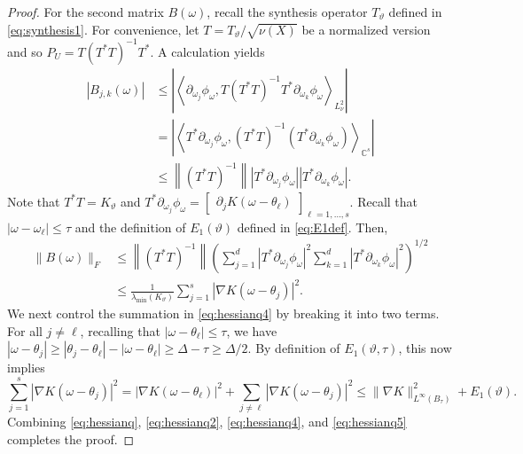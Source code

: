 \documentclass[10pt,a4paper]{amsart}
\def\C{\mathbb{C}}
\newcommand{\inner}[1]{{\left\langle#1\right\rangle}}
\newcommand{\norm}[1]{{\left\|#1\right\|}}
\newcommand{\sampset}{X}
\begin{document}
\begin{proof}
	For the second matrix $B(\omega)$, recall the synthesis operator $T_\vartheta$ defined in \eqref{eq:synthesis1}. For convenience, let $T=T_\vartheta/\sqrt{\nu(\sampset)}$ be a normalized version and so
	$
	P_U=T (T^*T)^{-1} T^*$. A calculation yields
	\begin{align*}
		|B_{j,k}(\omega)|
		&\leq \left|\inner{\partial_{\omega_j} \phi_\omega, T (T^*T)^{-1} T^*\partial_{\omega_k}\phi_\omega}_{L^2_\nu}\right| \\
		&=\left|\inner{T^*\partial_{\omega_j} \phi_\omega, (T^*T)^{-1} (T^*\partial_{\omega_k} \phi_\omega)}_{\C^s}\right| \\
		&\leq \norm{ (T^*T)^{-1}} |T^*\partial_{\omega_j} \phi_\omega| |T^*\partial_{\omega_k} \phi_\omega|.
	\end{align*}
	Note that $T^*T = K_\vartheta$ and $T^* \partial_{\omega_j} \phi_\omega
	= \begin{bmatrix}
		\partial_j K(\omega-\theta_\ell)
	\end{bmatrix}_{\ell=1,\dots,s}
	$. Recall that $|\omega-\omega_\ell|\leq \tau$ and the definition of $E_1(\vartheta)$ defined in \eqref{eq:E1def}. Then,
	\begin{equation}
		\begin{split}
			\|B(\omega)\|_F
			&\leq \norm{ (T^*T)^{-1}} \left(\sum_{j=1}^d |T^*\partial_{\omega_j} \phi_\omega|^2 \sum_{k=1}^d |T^*\partial_{\omega_k} \phi_\omega|^2\right)^{1/2} \\
			&\leq \frac{1}{\lambda_{\min}(K_\vartheta)} \sum_{j=1}^s |\nabla K(\omega-\theta_j)|^2.
		\end{split}
		\label{eq:hessianq4}
	\end{equation}	
	We next control the summation in \eqref{eq:hessianq4} by breaking it into two terms. For all $j\ne \ell$, recalling that $|\omega-\theta_\ell|\leq \tau$, we have 
	$
	|\omega-\theta_j|
	\geq |\theta_j-\theta_\ell| - |\omega-\theta_\ell|
	\geq \Delta-\tau\geq \Delta/2. 
	$
	By definition of $E_1(\vartheta,\tau)$, this now implies 
	\begin{equation}
		\sum_{j=1}^s |\nabla K(\omega-\theta_j)|^2
		=|\nabla K(\omega-\theta_\ell)|^2 + \sum_{j\ne\ell} |\nabla K(\omega-\theta_j)|^2
		\leq \|\nabla K\|_{L^\infty(B_\tau)}^2 + E_1(\vartheta). \label{eq:hessianq5}
	\end{equation}
	Combining \eqref{eq:hessianq}, \eqref{eq:hessianq2}, \eqref{eq:hessianq4}, and \eqref{eq:hessianq5} completes the proof.
	\end{proof}
\end{document}
